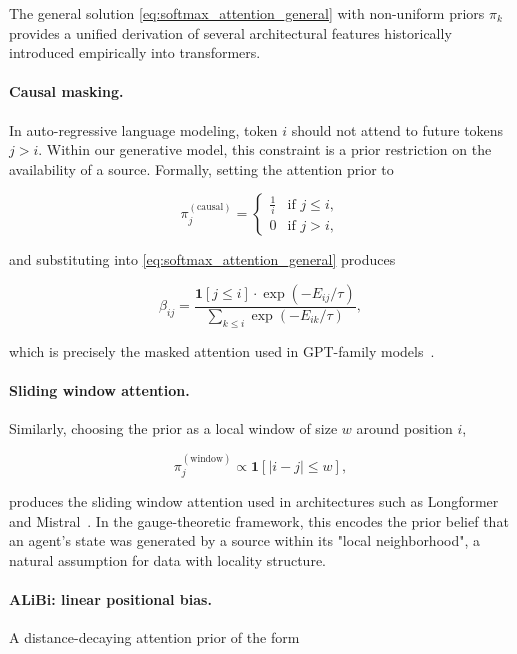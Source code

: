\documentclass[11pt]{article}
\begin{document}
The general solution \eqref{eq:softmax_attention_general} with non-uniform priors $\pi_k$ provides a unified derivation of several architectural features historically introduced empirically into transformers.

\paragraph{Causal masking.}
In auto-regressive language modeling, token $i$ should not attend to future tokens $j > i$. Within our generative model, this constraint is a prior restriction on the availability of a source. Formally, setting the attention prior to

\begin{equation}
\pi_j^{(\text{causal})} = \begin{cases} \frac{1}{i} & \text{if } j \leq i, \\ 0 & \text{if } j > i, \end{cases}
\label{eq:causal_prior}
\end{equation}

and substituting into \eqref{eq:softmax_attention_general} produces

\begin{equation}
\beta_{ij} = \frac{\mathbf{1}[j \leq i] \cdot \exp(-E_{ij}/\tau)}{\sum_{k \leq i} \exp(-E_{ik}/\tau)},
\label{eq:causal_attention}
\end{equation}

which is precisely the masked attention used in GPT-family models~\cite{radford2019language}.

\paragraph{Sliding window attention.}
Similarly, choosing the prior as a local window of size $w$ around position $i$,

\begin{equation}
\pi_j^{(\text{window})} \propto \mathbf{1}[|i - j| \leq w],
\label{eq:window_prior}
\end{equation}

produces the sliding window attention used in architectures such as Longformer~\cite{beltagy2020longformer} and Mistral~\cite{jiang2023mistral}. In the gauge-theoretic framework, this encodes the prior belief that an agent's state was generated by a source within its "local neighborhood", a natural assumption for data with locality structure.

\paragraph{ALiBi: linear positional bias.}
A distance-decaying attention prior of the form
\end{document}
